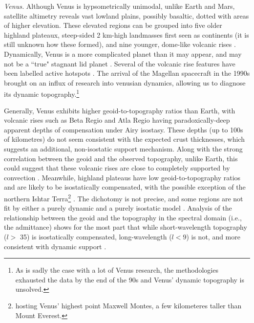 \vspace{0.5cm}

\textit{\color{teal1} Venus.} Although Venus is hypsometrically unimodal, unlike Earth and Mars, satellite altimetry reveals vast lowland plains, possibly basaltic, dotted with areas of higher elevation. These elevated regions can be grouped into five older highland plateaux, steep-sided 2 km-high landmasses first seen as continents (it is still unknown how these formed), and nine younger, dome-like volcanic rises \citep{Phillips1998}. Dynamically, Venus is a more complicated planet than it may appear, and may not be a ``true" stagnant lid planet \citep{Breuer2015}. Several of the volcanic rise features have been labelled active hotspots \citep{Kiefer1991, Smrekar1991, Grimm1992, Smrekar1994, Stofan1995, Smrekar2010}. The arrival of the Magellan spacecraft in the 1990s brought on an influx of research into venusian dynamics, allowing us to diagnose its dynamic topography.\footnote{As is sadly the case with a lot of Venus research, the methodologies exhausted the data by the end of the 90s and Venus' dynamic topography is unsolved.}

Generally, Venus exhibits higher geoid-to-topography ratios than Earth, with volcanic rises such as Beta Regio and Atla Regio having paradoxically-deep apparent depths of compensation under Airy isostasy. These depths (up to 100s of kilometres) do not seem consistent with the expected crust thicknesses, which suggests an additional, non-isostatic support mechanism. Along with the strong correlation between the geoid and the observed topography, unlike Earth, this could suggest that these volcanic rises are close to completely supported by convection \citep{Kiefer1986, Kiefer1991, Smrekar1994, McKenzie1994, Smrekar1996, Nimmo1996, Simons1997, Pauer2006, James2013, Yang2016}. Meanwhile, highland plateaus have low geoid-to-topography ratios and are likely to be isostatically compensated, with the possible exception of the northern Ishtar Terra\footnote{hosting Venus' highest point Maxwell Montes, a few kilometeres taller than Mount Everest.} \citep{Grimm1991, Kucinskas1994, Simons1997}. %
The dichotomy is not precise, and some regions are not fit by either a purely dynamic and a purely isostatic model \citep[e.g.,][]{Yang2016}. Analysis of the relationship between the geoid and the topography in the spectral domain (i.e., the admittance) shows for the most part that while short-wavelength topography ($l >$ 35) is isostatically compensated, long-wavelength ($l < 9$) is not, and more consistent with dynamic support \citep{Herrick2012, Konopliv1994, Arkani-Hamed1996, Pauer2006, Steinberger2010, Benesova2012, Huang2013, Yang2016}. 


